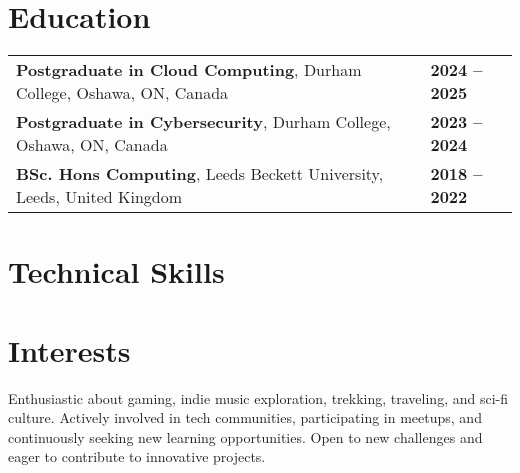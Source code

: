 \documentclass[11pt,a4paper,sans]{moderncv}
\newcommand{\sectionseparator}{\vspace{5pt}\par\noindent\makebox[\linewidth]{\rule{\textwidth}{0.4pt}}\vspace{0pt}}
\begin{document}
\sectionseparator

\section{Education}
\begin{tabular}{@{}p{} p{}@{}}
    \textbf{Postgraduate in Cloud Computing}, Durham College, Oshawa, ON, Canada & \hfill \textbf {2024 -- 2025} \\
    \textbf{Postgraduate in Cybersecurity}, Durham College, Oshawa, ON, Canada & \hfill \textbf {2023 -- 2024} \\
    \textbf{BSc. Hons Computing}, Leeds Beckett University, Leeds, United Kingdom & \hfill \textbf {2018 -- 2022} \\
\end{tabular}

\sectionseparator

\section{Technical Skills}


\sectionseparator

\section{Interests}
Enthusiastic about gaming, indie music exploration, trekking, traveling, and sci-fi culture. Actively involved in tech communities, participating in meetups, and continuously seeking new learning opportunities. Open to new challenges and eager to contribute to innovative projects.
\end{document}
